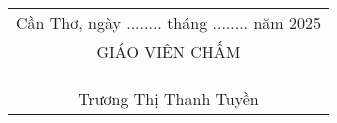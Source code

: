 \begin{flushright}
  \begin{tabular}{@{}c@{}}
    Cần Thơ, ngày ........ tháng ........ năm 2025 \\
    GIÁO VIÊN CHẤM                                 \\
    \\
    \\
    \\
    Trương Thị Thanh Tuyền                         \\
  \end{tabular}
\end{flushright}
\normalsize